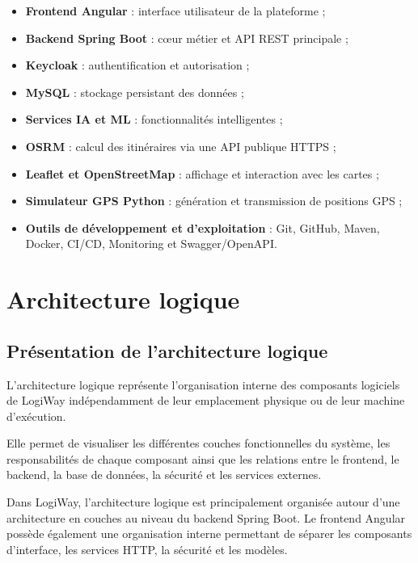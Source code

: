 \documentclass[12pt,a4paper]{report}
\begin{document}
\begin{itemize}
    \item \textbf{Frontend Angular} : interface utilisateur de la plateforme ;
    \item \textbf{Backend Spring Boot} : cœur métier et API REST principale ;
    \item \textbf{Keycloak} : authentification et autorisation ;
    \item \textbf{MySQL} : stockage persistant des données ;
    \item \textbf{Services IA et ML} : fonctionnalités intelligentes ;
    \item \textbf{OSRM} : calcul des itinéraires via une API publique HTTPS ;
    \item \textbf{Leaflet et OpenStreetMap} : affichage et interaction avec les cartes ;
    \item \textbf{Simulateur GPS Python} : génération et transmission de positions GPS ;
    \item \textbf{Outils de développement et d'exploitation} : Git, GitHub,
    Maven, Docker, CI/CD, Monitoring et Swagger/OpenAPI.
\end{itemize}

\section{Architecture logique}
\label{sec:ch2-archi-logique}

\subsection{Présentation de l'architecture logique}

L'architecture logique représente l'organisation interne des composants
logiciels de LogiWay indépendamment de leur emplacement physique ou de leur
machine d'exécution.

Elle permet de visualiser les différentes couches fonctionnelles du système,
les responsabilités de chaque composant ainsi que les relations entre le
frontend, le backend, la base de données, la sécurité et les services
externes.

Dans LogiWay, l'architecture logique est principalement organisée autour
d'une architecture en couches au niveau du backend Spring Boot. Le frontend
Angular possède également une organisation interne permettant de séparer les
composants d'interface, les services HTTP, la sécurité et les modèles.
\end{document}
